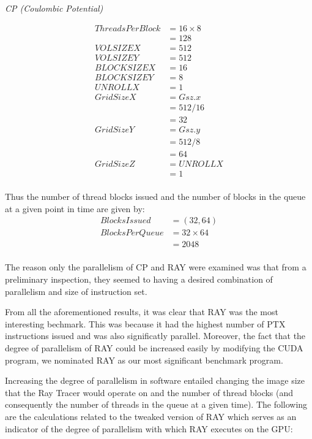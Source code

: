\emph{CP (Coulombic Potential)}

\begin{align*}
ThreadsPerBlock& = 16 \times 8\\
& = 128\\
VOLSIZEX& = 512\\
VOLSIZEY& = 512\\
BLOCKSIZEX& = 16\\
BLOCKSIZEY& = 8\\
UNROLLX&  = 1\\
GridSizeX& = Gsz.x\\& = 512/16\\& = 32\\
GridSizeY& = Gsz.y\\& = 512/8\\& = 64\\
GridSizeZ& = UNROLLX\\& = 1\\
\end{align*}

Thus the number of thread blocks issued and the number of blocks in
the queue at a given point in time are given by:
\begin{align*}
BlocksIssued& = (32, 64)\\
BlocksPerQueue& = 32 \times 64\\& = 2048\\
\end{align*}

The reason only the parallelism of CP and RAY were examined was that
from a preliminary inspection, they seemed to having a desired
combination of parallelism and size of instruction set. 

From all the aforementioned results, it was clear that RAY was the
most interesting bechmark. 
This was because it had the highest number of PTX instructions issued
and was also significatly parallel. 
Moreover, the fact that the degree of parallelism of RAY could be
increased easily by modifying the CUDA program, we nominated RAY as
our most significant benchmark program.
 

Increasing the degree of parallelism in software entailed changing the
image size that the Ray Tracer would operate on and the number of
thread blocks (and consequently the number of threads in the queue at
a given time). 
The following are the calculations related to the tweaked version of RAY which serves as an indicator of the degree of parallelism with which RAY executes on the GPU:

